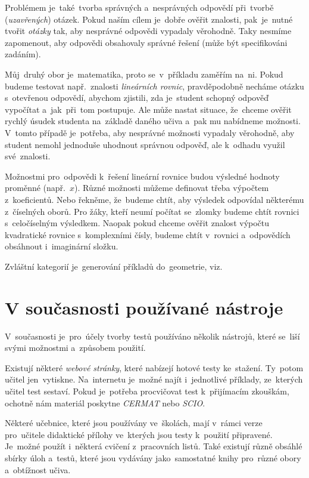 \documentclass[11pt,a4paper]{report}
\begin{document}
            Problémem je~také~tvorba správných a~nesprávných odpovědí při~tvorbě (\emph{uzavřených}) otázek. Pokud naším cílem je~dobře ověřit znalosti, pak~je~nutné tvořit \emph{otázky} tak, aby nesprávné odpovědi vypadaly věrohodně. Taky nesmíme zapomenout, aby odpovědi obsahovaly správné řešení (může být specifikováni zadáním).

            Můj~druhý obor je~matematika, proto se~v~příkladu zaměřím na~ni. Pokud budeme testovat např.~znalosti \emph{lineárních rovnic}, pravděpodobně necháme otázku s~otevřenou odpovědí, abychom zjistili, zda je~student schopný odpověď vypočítat a~jak~při~tom postupuje. Ale může nastat situace, že~chceme ověřit rychlý úsudek studenta na~základě daného učiva a~pak mu nabídneme možnosti. V~tomto případě je~potřeba, aby nesprávné možnosti vypadaly věrohodně, aby student nemohl jednoduše uhodnout správnou odpověď, ale k~odhadu využil své~znalosti.

            Možnostmi pro~odpovědi k~řešení lineární rovnice budou výsledné hodnoty proměnné (např.~$x$). Různé možnosti můžeme definovat třeba výpočtem z~koeficientů. Nebo řekněme, že~budeme chtít, aby výsledek odpovídal některému z~číselných oborů. Pro žáky, kteří neumí počítat se~zlomky budeme chtít rovnici s~celočíselným výsledkem. Naopak pokud chceme ověřit znalost výpočtu kvadratické rovnice s~komplexními čísly, budeme chtít v~rovnici a~odpovědích obsáhnout i~imaginární složku. \cite{zhouf:tvorbamatproblemu}

            Zvláštní kategorií je~generování příkladů do~geometrie, viz.~\cite{bak:generovaniplanimetrie}

        \section{V současnosti používané nástroje}
            V~současnosti je~pro~účely tvorby testů používáno několik nástrojů, které se~liší svými možnostmi a~způsobem použití.
            
            Existují některé \emph{webové stránky}, které nabízejí hotové testy ke~stažení. 
            Ty~potom učitel jen~vytiskne. Na~internetu je~možné najít i~jednotlivé příklady, ze~kterých učitel test sestaví. Pokud je~potřeba procvičovat test k~přijímacím zkouškám, ochotně nám materiál poskytne \emph{CERMAT} nebo \emph{SCIO}.

            Některé učebnice, které jsou používány ve~školách, mají v~rámci verze pro~učitele didaktické přílohy ve~kterých jsou testy k~použití připravené. Je~možné použít i~některá cvičení z~pracovních listů. Také existují různě obsáhlé sbírky úloh a~testů, které jsou vydávány jako~samostatné knihy pro~různé obory a~obtížnost učiva.
\end{document}

